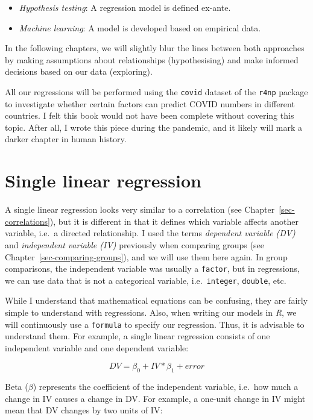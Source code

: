 \documentclass[
  letterpaper,
  DIV=11,
  numbers=noendperiod]{scrreprt}
\begin{document}
\begin{itemize}
\item
  \emph{Hypothesis testing}: A regression model is defined ex-ante.
\item
  \emph{Machine learning}: A model is developed based on empirical data.
\end{itemize}

In the following chapters, we will slightly blur the lines between both
approaches by making assumptions about relationships (hypothesising) and
make informed decisions based on our data (exploring).

All our regressions will be performed using the \texttt{covid} dataset
of the \texttt{r4np} package to investigate whether certain factors can
predict COVID numbers in different countries. I felt this book would not
have been complete without covering this topic. After all, I wrote this
piece during the pandemic, and it likely will mark a darker chapter in
human history.

\section{Single linear regression}\label{sec-single-linear-regression}

A single linear regression looks very similar to a correlation (see
Chapter~\ref{sec-correlations}), but it is different in that it defines
which variable affects another variable, i.e.~a directed relationship. I
used the terms \emph{dependent variable (DV)} and \emph{independent
variable (IV)} previously when comparing groups (see
Chapter~\ref{sec-comparing-groups}), and we will use them here again. In
group comparisons, the independent variable was usually a
\texttt{factor}, but in regressions, we can use data that is not a
categorical variable, i.e.~\texttt{integer}, \texttt{double}, etc.

While I understand that mathematical equations can be confusing, they
are fairly simple to understand with regressions. Also, when writing our
models in \emph{R}, we will continuously use a \texttt{formula} to
specify our regression. Thus, it is advisable to understand them. For
example, a single linear regression consists of one independent variable
and one dependent variable:

\[
DV = \beta_{0} + IV * \beta_{1} + error
\]

Beta (\(\beta\)) represents the coefficient of the independent variable,
i.e.~how much a change in IV causes a change in DV. For example, a
one-unit change in IV might mean that DV changes by two units of IV:
\end{document}
